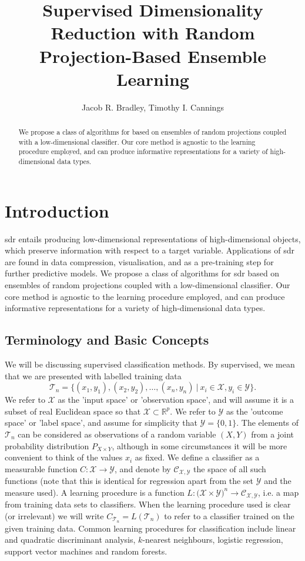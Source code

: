 \documentclass[12pt]{article}
\title{Supervised Dimensionality Reduction with Random Projection-Based Ensemble Learning}
\author{Jacob R. Bradley, Timothy I. Cannings}
\date{}
\begin{document}
\maketitle

\begin{abstract}
We propose a class of algorithms for  based on ensembles of random projections coupled with a low-dimensional classifier. Our core method is agnostic to the learning procedure employed, and can produce informative representations for a variety of high-dimensional data types.
\end{abstract}

\section{Introduction}
\gls{sdr} entails producing low-dimensional representations of high-dimensional objects, which preserve information with respect to a target variable. Applications of \gls{sdr} are found in data compression, visualisation, and as a pre-training step for further predictive models. We propose a class of algorithms for \gls{sdr} based on ensembles of random projections coupled with a low-dimensional classifier. Our core method is agnostic to the learning procedure employed, and can produce informative representations for a variety of high-dimensional data types.

\subsection{Terminology and Basic Concepts}
We will be discussing supervised classification methods. By supervised, we mean that we are presented with labelled training data 
\[ \mathcal{T}_n = \{(x_1, y_1), (x_2, y_2), \dots, (x_n, y_n) \ | \ x_i \in \mathcal{X}, y_i \in \mathcal{Y}\}. \]
We refer to $\mathcal{X}$ as the 'input space' or 'observation space', and will assume it is a subset of real Euclidean space so that $\mathcal{X} \subset \mathbb{R}^p$. We refer to $\mathcal{Y}$ as the 'outcome space' or 'label space', and assume for simplicity that $\mathcal{Y} = \{0,1\}$. The elements of $\mathcal{T}_n$ can be considered as observations of a random variable $(X,Y)$ from a joint probability distribution $P_{X \times Y}$, although in some circumstances it will be more convenient to think of the values $x_i$ as fixed. We define a classifier as a measurable function $C: \mathcal{X} \rightarrow \mathcal{Y}$, and denote by $\mathcal{C}_{\mathcal{X},\mathcal{Y}}$ the space of all such functions (note that this is identical for regression apart from the set $\mathcal{Y}$ and the measure used). A learning procedure is a function $L : \mathcal(\mathcal{X} \times \mathcal{Y})^n \rightarrow \mathcal{C}_{\mathcal{X},\mathcal{Y}}$, i.e. a map from training data sets to classifiers. When the learning procedure used is clear (or irrelevant) we will write $C_{\mathcal{T}_n} = L(\mathcal{T}_n)$ to refer to a classifier trained on the given training data. Common learning procedures for classification include linear and quadratic discriminant analysis, $k$-nearest neighbours, logistic regression, support vector machines and random forests. 
\end{document}
